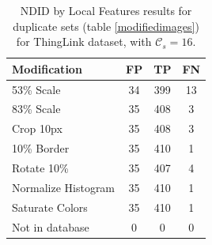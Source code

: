 \documentclass[english,12pt,a4paper,pdftex,elec,utf8, table]{aaltothesis}
\begin{document}
\begin{table}
\caption{ NDID by Local Features results for duplicate sets (table \ref{modifiedimages}) for ThingLink dataset, with $\mathcal{C}_s = 16$.}
\label{thinglinksiftresults}
\begin{center}
  \begin{tabular}{@{}lccc@{}}
    \toprule
    Modification & FP & TP & FN\\
    \hline
    53\% Scale & 34 & 399 & 13 \\
    83\% Scale & 35 & 408 & 3 \\
    Crop 10px  & 35 & 408 & 3 \\
    10\% Border & 35 & 410 & 1 \\
    Rotate 10\% & 35 & 407 & 4\\
    Normalize Histogram & 35 & 410 & 1\\
    Saturate Colors & 35 & 410 & 1\\
    Not in database & 0 & 0 & 0\\
    \bottomrule
\end{tabular}
\end{center}
\end{table}


\end{document}
